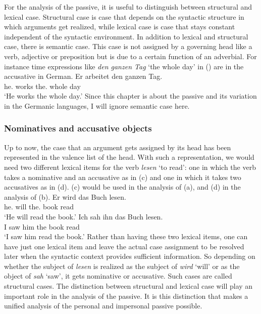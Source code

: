 For the analysis of the passive, it is useful to distinguish between structural and lexical
case. Structural case is case that depends on the syntactic structure in which arguments get
realized, while lexical case is case that stays constant independent of the syntactic environment. In
addition to lexical and structural case, there is semantic case. This case is not assigned by a
governing head like a verb, adjective or preposition but is due to a certain function of an
adverbial. For instance time expressions like \emph{den ganzen Tag} `the whole day' in () are
in the accusative in German.
\ea
\gll Er arbeitet den ganzen Tag.\\
     he.\NOM{} works the.\ACC{} whole day\\\german
\glt `He works the whole day.'
\z
Since this chapter is about the passive and its variation in the Germanic languages, I will ignore
semantic case here.

\subsubsection{Nominatives and accusative objects}

Up to now, the case that an argument gets assigned by its head has been represented in the valence list of
the head. With such a representation, we would need two different lexical items for the verb
\emph{lesen} `to read': one in which the verb takes a nominative and an accusative as in
(c) and one in which it takes two accusatives as in (d). (c) would be used in
the analysis of (a), and (d) in the analysis of (b).
\eal
\ex 
\gll Er        wird das        Buch lesen.\\
     he.\NOM{} will the.\ACC{} book read\\\german
\glt `He will read the book.'
\ex 
\gll Ich sah ihn das Buch lesen.\\
     I   saw him the book read\\
\glt `I saw him read the book.'
\ex {}
\ex {}
\zl
Rather than having these two lexical items, one can have just one lexical item and leave the actual
case assignment to be resolved later when the syntactic context provides sufficient information. So
depending on whether the subject of \emph{lesen} is realized as the 
subject of \emph{wird} `will' or as the object of \emph{sah} `saw', it gets nominative or accusative. Such
cases are called structural cases. The distinction between structural and lexical case will play an
important role in the analysis of the passive. It is this distinction that makes a unified analysis of
the personal and impersonal passive possible.

